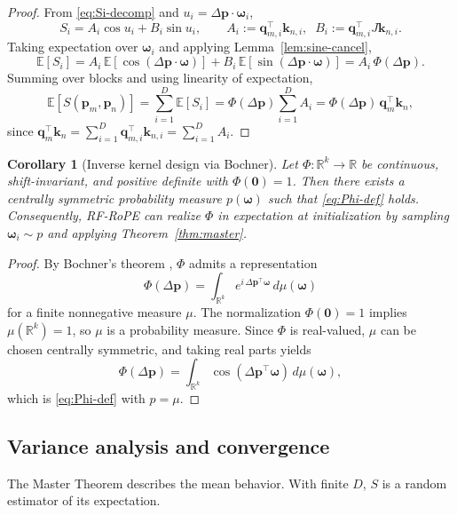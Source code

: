 \documentclass{article}
\theoremstyle{plain}
\newtheorem{corollary}[theorem]{Corollary}
\theoremstyle{remark}
\begin{document}
\begin{proof}
From \eqref{eq:Si-decomp} and $u_i=\Delta\mathbf{p}\cdot\boldsymbol{\omega}_i$,
\[
S_i
=
A_i\cos u_i + B_i\sin u_i,
\qquad
A_i:=\mathbf{q}_{m,i}^\top \mathbf{k}_{n,i},\;\;
B_i:=\mathbf{q}_{m,i}^\top J\mathbf{k}_{n,i}.
\]
Taking expectation over $\boldsymbol{\omega}_i$ and applying Lemma~\ref{lem:sine-cancel},
\[
\mathbb{E}[S_i]
=
A_i\,\mathbb{E}[\cos(\Delta\mathbf{p}\cdot\boldsymbol{\omega})]
+
B_i\,\mathbb{E}[\sin(\Delta\mathbf{p}\cdot\boldsymbol{\omega})]
=
A_i\,\Phi(\Delta\mathbf{p}).
\]
Summing over blocks and using linearity of expectation,
\[
\mathbb{E}\!\left[S(\mathbf{p}_m,\mathbf{p}_n)\right]
=
\sum_{i=1}^{D}\mathbb{E}[S_i]
=
\Phi(\Delta\mathbf{p})\sum_{i=1}^{D}A_i
=
\Phi(\Delta\mathbf{p})\,\mathbf{q}_m^\top \mathbf{k}_n,
\]
since $\mathbf{q}_m^\top \mathbf{k}_n=\sum_{i=1}^D \mathbf{q}_{m,i}^\top \mathbf{k}_{n,i}=\sum_{i=1}^D A_i$.
\end{proof}

\begin{corollary}[Inverse kernel design via Bochner]
\label{cor:bochner}
Let $\Phi:\mathbb{R}^k\to\mathbb{R}$ be continuous, shift-invariant, and positive definite with $\Phi(\mathbf{0})=1$. Then there exists a centrally symmetric probability measure $p(\boldsymbol{\omega})$ such that \eqref{eq:Phi-def} holds. Consequently, RF-RoPE can realize $\Phi$ in expectation at initialization by sampling $\boldsymbol{\omega}_i\sim p$ and applying Theorem~\ref{thm:master}.
\end{corollary}

\begin{proof}
By Bochner's theorem \cite{bochner1955harmonic,rasmussen2006gpml}, $\Phi$ admits a representation
\[
\Phi(\Delta\mathbf{p})=\int_{\mathbb{R}^k} e^{i\,\Delta\mathbf{p}^\top \boldsymbol{\omega}}\,d\mu(\boldsymbol{\omega})
\]
for a finite nonnegative measure $\mu$. The normalization $\Phi(\mathbf{0})=1$ implies $\mu(\mathbb{R}^k)=1$, so $\mu$ is a probability measure. Since $\Phi$ is real-valued, $\mu$ can be chosen centrally symmetric, and taking real parts yields
\[
\Phi(\Delta\mathbf{p})
=
\int_{\mathbb{R}^k}\cos(\Delta\mathbf{p}^\top \boldsymbol{\omega})\,d\mu(\boldsymbol{\omega}),
\]
which is \eqref{eq:Phi-def} with $p=\mu$.
\end{proof}

\subsection{Variance analysis and convergence}
The Master Theorem describes the mean behavior. With finite $D$, $S$ is a random estimator of its expectation.
\end{document}
